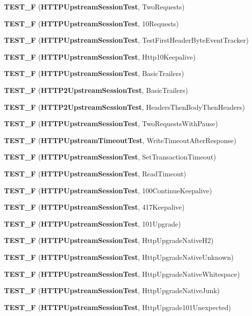 \begin{DoxyCompactItemize}
{\bf T\+E\+S\+T\+\_\+F} ({\bf H\+T\+T\+P\+Upstream\+Session\+Test}, Two\+Requests)
\item 
{\bf T\+E\+S\+T\+\_\+F} ({\bf H\+T\+T\+P\+Upstream\+Session\+Test}, 10\+Requests)
\item 
{\bf T\+E\+S\+T\+\_\+F} ({\bf H\+T\+T\+P\+Upstream\+Session\+Test}, Test\+First\+Header\+Byte\+Event\+Tracker)
\item 
{\bf T\+E\+S\+T\+\_\+F} ({\bf H\+T\+T\+P\+Upstream\+Session\+Test}, Http10\+Keepalive)
\item 
{\bf T\+E\+S\+T\+\_\+F} ({\bf H\+T\+T\+P\+Upstream\+Session\+Test}, Basic\+Trailers)
\item 
{\bf T\+E\+S\+T\+\_\+F} ({\bf H\+T\+T\+P2\+Upstream\+Session\+Test}, Basic\+Trailers)
\item 
{\bf T\+E\+S\+T\+\_\+F} ({\bf H\+T\+T\+P2\+Upstream\+Session\+Test}, Headers\+Then\+Body\+Then\+Headers)
\item 
{\bf T\+E\+S\+T\+\_\+F} ({\bf H\+T\+T\+P\+Upstream\+Session\+Test}, Two\+Requests\+With\+Pause)
\item 
{\bf T\+E\+S\+T\+\_\+F} ({\bf H\+T\+T\+P\+Upstream\+Timeout\+Test}, Write\+Timeout\+After\+Response)
\item 
{\bf T\+E\+S\+T\+\_\+F} ({\bf H\+T\+T\+P\+Upstream\+Session\+Test}, Set\+Transaction\+Timeout)
\item 
{\bf T\+E\+S\+T\+\_\+F} ({\bf H\+T\+T\+P\+Upstream\+Session\+Test}, Read\+Timeout)
\item 
{\bf T\+E\+S\+T\+\_\+F} ({\bf H\+T\+T\+P\+Upstream\+Session\+Test}, 100\+Continue\+Keepalive)
\item 
{\bf T\+E\+S\+T\+\_\+F} ({\bf H\+T\+T\+P\+Upstream\+Session\+Test}, 417\+Keepalive)
\item 
{\bf T\+E\+S\+T\+\_\+F} ({\bf H\+T\+T\+P\+Upstream\+Session\+Test}, 101\+Upgrade)
\item 
{\bf T\+E\+S\+T\+\_\+F} ({\bf H\+T\+T\+P\+Upstream\+Session\+Test}, Http\+Upgrade\+Native\+H2)
\item 
{\bf T\+E\+S\+T\+\_\+F} ({\bf H\+T\+T\+P\+Upstream\+Session\+Test}, Http\+Upgrade\+Native\+Unknown)
\item 
{\bf T\+E\+S\+T\+\_\+F} ({\bf H\+T\+T\+P\+Upstream\+Session\+Test}, Http\+Upgrade\+Native\+Whitespace)
\item 
{\bf T\+E\+S\+T\+\_\+F} ({\bf H\+T\+T\+P\+Upstream\+Session\+Test}, Http\+Upgrade\+Native\+Junk)
\item 
{\bf T\+E\+S\+T\+\_\+F} ({\bf H\+T\+T\+P\+Upstream\+Session\+Test}, Http\+Upgrade101\+Unexpected)

\end{DoxyCompactItemize}
